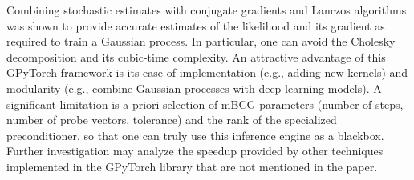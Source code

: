 \documentclass{article}
\begin{document}
Combining stochastic estimates with conjugate gradients and Lanczos algorithms was shown to provide accurate estimates of the likelihood and its gradient as required to train a Gaussian process. In particular, one can avoid the Cholesky decomposition and its cubic-time complexity. 
An attractive advantage of this GPyTorch framework is its ease of implementation (e.g., adding new kernels) and modularity (e.g., combine Gaussian processes with deep learning models). A significant limitation is a-priori selection of mBCG parameters (number of steps, number of probe vectors, tolerance) and the rank of the specialized preconditioner, so that one can truly use this inference engine as a blackbox. 
Further investigation may analyze the speedup provided by other techniques implemented in the GPyTorch library that are not mentioned in the paper. 


\end{document}
